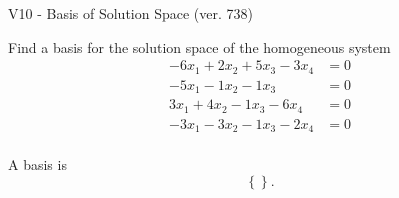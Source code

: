 \begin{exercise}
  \begin{exerciseTitle}V10 - Basis of Solution Space (ver. 738)\end{exerciseTitle}
  \begin{exerciseStatement}
    Find a basis for the solution space of the homogeneous system 
\begin{align*}
 -6 x_ 1 + 2 x_ 2 + 5 x_ 3 -3 x_ 4 &= 0  \\ 
  -5 x_ 1 -1 x_ 2 -1 x_ 3 &= 0  \\ 
  3 x_ 1 + 4 x_ 2 -1 x_ 3 -6 x_ 4 &= 0  \\ 
  -3 x_ 1 -3 x_ 2 -1 x_ 3 -2 x_ 4 &= 0  \\ 
 \end{align*}


 
  \end{exerciseStatement}

  \begin{exerciseAnswer}
   A basis is   
\[\left\{\right\}.\]

  


  \end{exerciseAnswer}
\end{exercise}